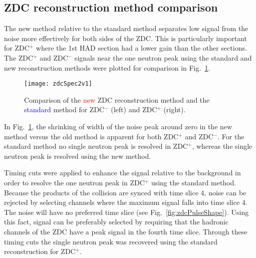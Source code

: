    \subsection{ZDC reconstruction method comparison}
      The new method relative to the standard method separates low signal from 
        the noise more effectively for both sides of the ZDC.
      This is particularly important for ZDC$^{+}$ where the 1st HAD section
        had a lower gain than the other sections. 
      The ZDC$^{+}$ and ZDC$^{-}$ signals near the one neutron peak using the
        standard and new reconstruction methods were plotted for comparison in 
        Fig.~\ref{fig:zdcSpec2v1}.
      \begin{figure}[h]
        \centering
        \texttt{[image: zdcSpec2v1]}
        \caption{Comparison of the \textcolor{red}{new} ZDC reconstruction 
          method and the \textcolor{blue}{standard} method for ZDC$^{-}$ (left) and 
          ZDC$^{+}$ (right).}
        \label{fig:zdcSpec2v1}
      \end{figure}
      In Fig.~\ref{fig:zdcSpec2v1}, the shrinking of width of the noise peak 
        around zero in the new method versus the old method is apparent for
        both ZDC$^{+}$ and ZDC$^{-}$.
      For the standard method no single neutron peak is resolved in ZDC$^{+}$,
        whereas the single neutron peak is resolved using the new method. 

      Timing cuts were applied to enhance the signal relative to the background
        in order to resolve the one neutron peak in ZDC$^{+}$ using the 
        standard method. 
      Because the products of the collision are synced with time slice 4, noise
        can be rejected by selecting channels where the maximum signal falls 
        into time slice 4.
      The noise will have no preferred time slice (see Fig.~\ref{fig:zdcPulseShape}). 
      Using this fact, signal can be preferably selected by requiring that the
        hadronic channels of the ZDC have a peak signal in the fourth time 
        slice.
      Through these timing cuts the single neutron peak was recovered using the
       standard reconstruction for ZDC$^{+}$.

